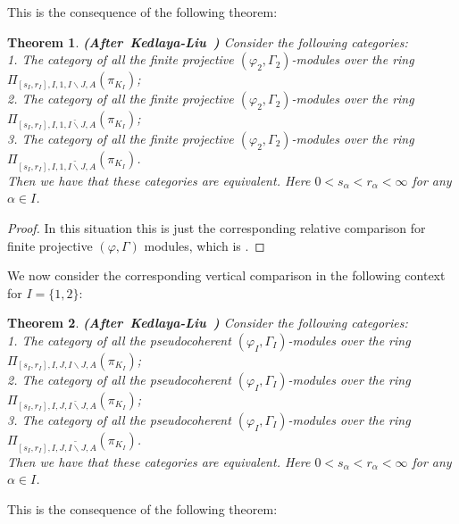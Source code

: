 \documentclass[12pt]{amsart}
\newtheorem{theorem}{Theorem}[section]
\theoremstyle{definition}
\numberwithin{equation}{section}
\begin{document}
\indent This is the consequence of the following theorem:


\begin{theorem} \mbox{\bf{(After Kedlaya-Liu \cite[Theorem 5.7.5]{KL2})}}
Consider the following categories:\\
1. The category of all the finite projective $(\varphi_2,\Gamma_2)$-modules over the ring $\Pi_{[s_I,r_{I}],I,{1},I\backslash J,A}(\pi_{K_I})$;\\
2. The category of all the finite projective $(\varphi_2,\Gamma_2)$-modules over the ring $\Pi_{[s_I,r_{I}],I,{1},\breve{I\backslash J},A}(\pi_{K_I})$;\\
3. The category of all the finite projective $(\varphi_2,\Gamma_2)$-modules over the ring $\Pi_{[s_I,r_{I}],I,{1},\widetilde{I\backslash J},A}(\pi_{K_I})$.\\
Then we have that these categories are equivalent. Here $0< s_\alpha<r_\alpha<\infty$ for any $\alpha\in I$.
\end{theorem}



\begin{proof}
In this situation this is just the corresponding relative comparison for finite projective $(\varphi,\Gamma)$ modules, which is \cite[Theorem 4.4]{KP}.	
\end{proof}




\indent We now consider the corresponding vertical comparison in the following context for $I=\{1,2\}$:


\begin{theorem}\mbox{\bf{(After Kedlaya-Liu \cite[Theorem 5.7.5]{KL2})}}
Consider the following categories:\\
1. The category of all the pseudocoherent $(\varphi_I,\Gamma_I)$-modules over the ring $\Pi_{[s_I,r_{I}],I,J,I\backslash J,A}(\pi_{K_I})$;\\
2. The category of all the pseudocoherent $(\varphi_I,\Gamma_I)$-modules over the ring $\Pi_{[s_I,r_{I}],I,J,\breve{I\backslash J},A}(\pi_{K_I})$;\\
3. The category of all the pseudocoherent $(\varphi_I,\Gamma_I)$-modules over the ring $\Pi_{[s_I,r_{I}],I,J,\widetilde{I\backslash J},A}(\pi_{K_I})$.\\
Then we have that these categories are equivalent. Here $0< s_\alpha<r_\alpha<\infty$ for any $\alpha\in I$.
\end{theorem}


\indent This is the consequence of the following theorem:
\end{document}
